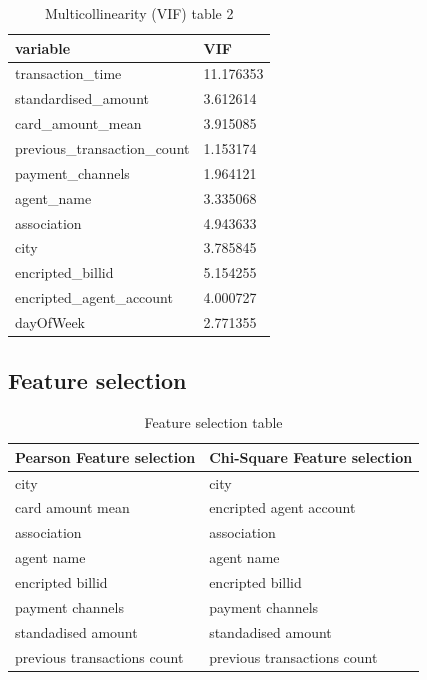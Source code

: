 \newpage
\begin{table}[h]
    \centering
    \begin{tabular}{|l|l|}
        \hline
        variable & VIF \\ \hline
        transaction\_time & 11.176353\\ \hline
        standardised\_amount &  3.612614\\ \hline
        card\_amount\_mean &  3.915085\\ \hline
        previous\_transaction\_count  & 1.153174\\ \hline
        payment\_channels  & 1.964121\\ \hline
        agent\_name  & 3.335068\\ \hline
        association &  4.943633\\ \hline
        city  & 3.785845\\ \hline
        encripted\_billid &  5.154255\\ \hline
        encripted\_agent\_account &  4.000727\\ \hline
        dayOfWeek  & 2.771355\\ \hline
    \end{tabular}
    \caption{Multicollinearity (VIF) table 2}
    \label{Multicollinearity (VIF) table 2}
\end{table}

\subsection{Feature selection}
\vspace{1cm}
\begin{table}[h]
    \centering
    \begin{tabular}{|l|l|}
        \hline
        \textbf{Pearson Feature selection} & \textbf{Chi-Square Feature selection} \\ \hline
        city & city\\ \hline
        card amount mean &  encripted agent account\\ \hline
        association &  association\\ \hline
        agent name  & agent name\\ \hline
        encripted billid  & encripted billid\\ \hline
        payment channels  & payment channels\\ \hline
        standadised amount &  standadised amount\\ \hline
        previous transactions count  & previous transactions count\\ \hline
    \end{tabular}
    \caption{Feature selection table}
    \label{Feature selection table}
\end{table}

